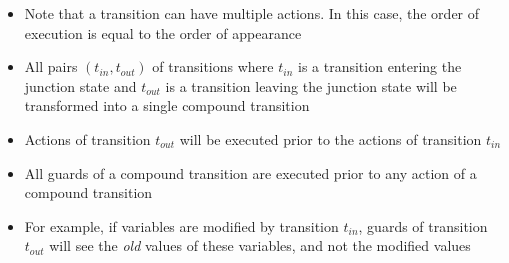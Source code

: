 \begin{frame}[fragile=singleslide]
\begin{itemize}
\item Note that a transition can have multiple actions. In this case, the order of
      execution is equal to the order of appearance
\item All pairs $(t_{in},t_{out})$ of transitions where $t_{in}$ is a transition entering the junction state
      and $t_{out}$ is a transition leaving the junction state will be transformed into a single compound transition
\item Actions of transition $t_{out}$ will be executed prior to the actions of transition $t_{in}$
\item All guards of a compound transition are executed prior to any action of a compound transition
\item For example, if variables are modified by transition $t_{in}$, guards of transition $t_{out}$ 
      will see the \emph{old} values of these variables, and not the modified values
\end{itemize}
\end{frame}
